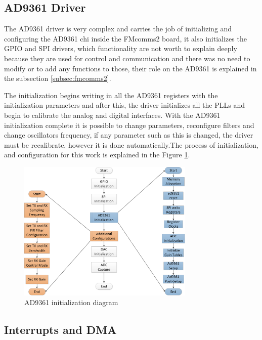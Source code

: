 \subsection{AD9361 Driver}

The AD9361 driver is very complex and carries the job of initializing and
configuring the AD9361 chi inside the FMcomms2 board, it also initializes the
GPIO and SPI drivers, which functionality are not worth to explain deeply
because they are used for control and communication and there was no need to
modify or to add any functions to those, their role on the AD9361 is explained
in the subsection \ref{subsec:fmcomms2}.

The initialization begins writing in all the AD9361 registers with the
initialization parameters and after this, the driver initializes all the PLLs
and begin to calibrate the analog and digital interfaces. With the AD9361
initialization complete it is possible to change parameters, reconfigure filters
and  change oscillators frequency, if any parameter such as this is changed, the
driver must be recalibrate, however it is done automatically.The process of
initialization, and configuration for this work is explained in the Figure
\ref{fig:ad9361init}.


\begin{figure}[htbp]
    \centering
    \includegraphics[width=0.75\textwidth]{./figures/ad9361_driver}
    \caption{ AD9361 initialization diagram
    \label{fig:ad9361init}}
\end{figure}

\subsection{Interrupts and DMA}

